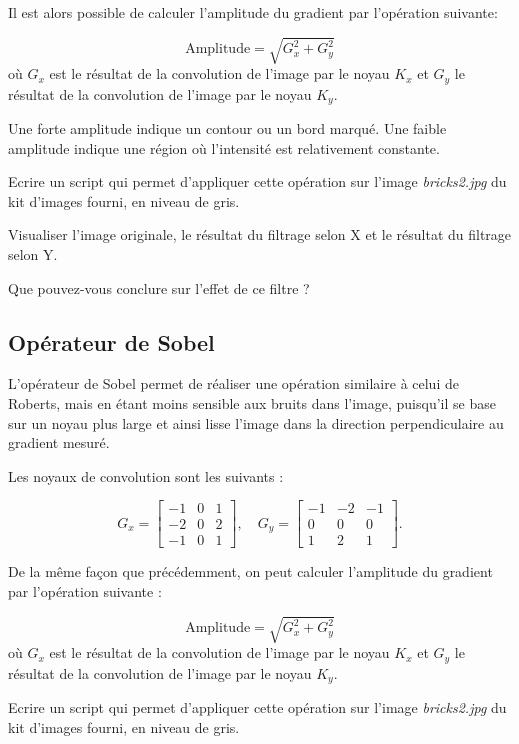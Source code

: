 \documentclass[a4paper,11pt,titlepage]{article} %
\begin{document}
Il est alors possible de calculer l'amplitude du gradient par l'opération suivante: 

$$\text{Amplitude} = \sqrt{G_x^2 + G_y^2}$$ où $G_x$ est le résultat de la convolution de l'image par le noyau $K_x$ et $G_y$ le résultat de la convolution de l'image par le noyau $K_y$.

Une forte amplitude indique un contour ou un bord marqué. Une faible amplitude indique une région où l'intensité est relativement constante.

\medskip

\Manip Ecrire un script qui permet d'appliquer cette opération sur l'image \textsl{bricks2.jpg} du kit d'images fourni, en niveau de gris.

\Manip Visualiser l'image originale, le résultat du filtrage selon X et le résultat du filtrage selon Y.

\Quest Que pouvez-vous conclure sur l'effet de ce filtre ?

\subsection{Opérateur de Sobel}

L'opérateur de Sobel permet de réaliser une opération similaire à celui de Roberts, mais en étant moins sensible aux bruits dans l'image, puisqu'il se base sur un noyau plus large et ainsi lisse l'image dans la direction perpendiculaire au gradient mesuré.

Les noyaux de convolution sont les suivants :

$$G_x = \begin{bmatrix}
-1 & 0 & 1 \\
-2 & 0 & 2 \\
-1 & 0 & 1 
\end{bmatrix},
\quad
G_y =
\begin{bmatrix}
-1 & -2 & -1 \\
0 & 0 & 0 \\
1 & 2 & 1 
\end{bmatrix}.
$$

De la même façon que précédemment, on peut calculer l'amplitude du gradient par l'opération suivante : 

$$\text{Amplitude} = \sqrt{G_x^2 + G_y^2}$$ où $G_x$ est le résultat de la convolution de l'image par le noyau $K_x$ et $G_y$ le résultat de la convolution de l'image par le noyau $K_y$.

\medskip

\Manip Ecrire un script qui permet d'appliquer cette opération sur l'image \textsl{bricks2.jpg} du kit d'images fourni, en niveau de gris.
\end{document}
